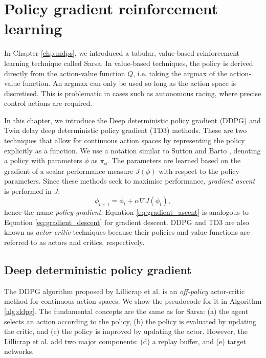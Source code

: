 \chapter{Policy gradient reinforcement learning}
\label{chp:rl}

In Chapter \ref{chp:mdps}, we introduced a tabular, value-based reinforcement learning technique called Sarsa.
In value-based techniques, the policy is derived directly from the action-value function $Q$, i.e. taking the argmax of the action-value function.
An argmax can only be used so long as the action space is discretised.
This is problematic in cases such as autonomous racing, where precise control actions are required. 

In this chapter, we introduce the Deep deterministic policy gradient (DDPG) and Twin delay deep deterministic policy gradient (TD3) methods.
These are two techniques that allow for continuous action spaces by representing the policy explicitly as a function.
We use a notation similar to Sutton and Barto \cite{sutton2020}, denoting a policy with parameters $\phi$ as $\pi_\phi$.
The parameters are learned based on the gradient of a scalar performance measure $J(\phi)$ with respect to the policy parameters.
Since these methods seek to maximise performance, \emph{gradient ascent} is performed in $J$:
\begin{equation}\label{eq:gradient_ascent}
    \phi_{t+1} =  \phi_{t} + \alpha \nabla J( \phi_{t} ),
\end{equation}
hence the name \emph{policy gradient}.
Equation \ref{eq:gradient_ascent} is analogous to Equation \ref{eq:gradient_descent} for gradient descent.
DDPG and TD3 are also known as \emph{actor-critic} techniques because their policies and value functions are referred to as actors and critics, respectively.


\section{Deep deterministic policy gradient}
The  DDPG algorithm proposed by Lillicrap et al. \cite{Lillicrap2016} is an \emph{off-policy} actor-critic method for continuous action spaces. 
We show the pseudocode for it in Algorithm \ref{alg:ddpg}. 
The fundamental concepts are the same as for Sarsa: (a) the agent selects an action according to the policy, (b) the policy is evaluated by updating the critic, and (c) the policy is improved by updating the actor.
However, the Lillicrap et al. \cite{Lillicrap2016} add two major components: (d) a replay buffer, and (e) target networks.

